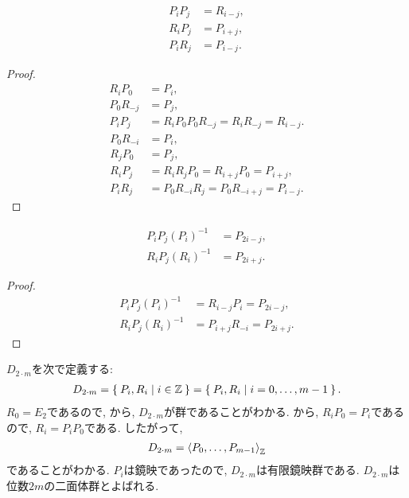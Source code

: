 \begin{lemma}
  \label{lem:i2m:rel:pp=r:pr=p:rp=p}
  \begin{align*}
    P_i P_j&= R_{i-j},\\
    R_i P_j&= P_{i+j},\\
    P_i R_j&= P_{i-j}.
  \end{align*}
\end{lemma}
\begin{proof}
  \begin{align*}
    R_iP_0&=P_i,\\
    P_0R_{-j} &= P_{j},\\
    P_iP_j&=R_i P_0P_0R_{-j}=R_{i}R_{-j}=R_{i-j}.
  \end{align*}
  \begin{align*}
    P_0R_{-i} &= P_{i},\\
    R_jP_0&=P_j,\\
    R_iP_j&=R_iR_jP_0=R_{i+j}P_0=P_{i+j},\\
    P_iR_j&=P_0R_{-i}R_j=P_0R_{-i+j}=P_{i-j}.
  \end{align*}
\end{proof}


\begin{lemma}
  \label{lem:i2m:rel:ppp=p:rpr=p:}
  \begin{align*}
    P_i P_j (P_i)^{-1}&= P_{2i-j},\\
    R_i P_j (R_i)^{-1}&= P_{2i+j}.
  \end{align*}
\end{lemma}
\begin{proof}
  \begin{align*}
    P_i P_j (P_i)^{-1}
    &=R_{i-j}P_i
    =P_{2i-j},\\
    R_i P_j (R_i)^{-1}&= P_{i+j}R_{-i}=P_{2i+j}.
  \end{align*}
\end{proof}


$D_{2\cdot m}$を次で定義する:
\begin{align*}
  D_{2\cdot m} = \Set{P_i,R_i|i\in \mathbb{Z}} = \Set{P_i,R_i|i=0,\ldots,m-1}.
\end{align*}
$R_0=E_2$であるので,
から,
$D_{2\cdot m}$が群であることがわかる.
から,
$R_iP_0=P_i$であるので,
$R_i=P_iP_0$である.
したがって,
\begin{align*}
   D_{2\cdot m} = \Braket{P_0,\ldots,P_{m-1}}_{\mathbb{Z}}
\end{align*}
であることがわかる.
$P_i$は鏡映であったので,
$D_{2\cdot m}$は有限鏡映群である.
$D_{2\cdot m}$は位数$2m$の二面体群とよばれる.

